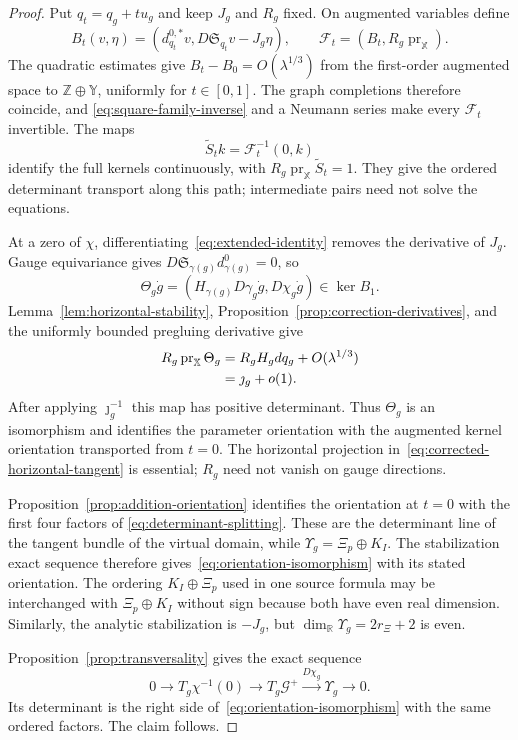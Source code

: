 \documentclass[11pt]{amsart}
\theoremstyle{definition}
\theoremstyle{remark}
\theoremstyle{plain}
\newcommand{\RR}{\mathbb{R}}
\newcommand{\cG}{\mathcal{G}}
\begin{document}
\begin{proof}
Put $q_t=q_g+t u_g$ and keep $J_g$ and $R_g$ fixed.  On augmented
variables define
\begin{equation}\label{eq:corrected-kernel-transport}
 B_t(v,\eta)=
 (d_{q_t}^{0,*}v,D\mathfrak S_{q_t}v-J_g\eta),\qquad
 \mathcal F_t=(B_t,R_g\operatorname{pr}_{\mathbb X}).
\end{equation}
The quadratic estimates give $B_t-B_0=O(\lambda^{1/3})$ from the
first-order augmented space to $\mathbb Z\oplus\mathbb Y$, uniformly
for $t\in[0,1]$.  The graph completions therefore coincide, and
\eqref{eq:square-family-inverse} and a Neumann series make every
$\mathcal F_t$ invertible.  The maps
\[
 \widetilde S_t k=\mathcal F_t^{-1}(0,k)
\]
identify the full kernels continuously, with
$R_g\operatorname{pr}_{\mathbb X}\widetilde S_t=1$.  They give the
ordered determinant transport along this path; intermediate pairs
need not solve the equations.

At a zero of $\chi$, differentiating~\eqref{eq:extended-identity}
removes the derivative of $J_g$.  Gauge equivariance gives
$D\mathfrak S_{\gamma(g)}d_{\gamma(g)}^0=0$, so
\begin{equation}\label{eq:corrected-horizontal-tangent}
 \Theta_g\dot g=
 (H_{\gamma(g)}D\gamma_g\dot g,D\chi_g\dot g)
 \in\ker B_1.
\end{equation}
Lemma~\ref{lem:horizontal-stability},
Proposition~\ref{prop:correction-derivatives}, and the uniformly bounded
pregluing derivative give
\begin{align}\label{eq:corrected-tangent-retraction}
 R_g\operatorname{pr}_{\mathbb X}\Theta_g
 &=R_gH_gdq_g+O(\lambda^{1/3})\notag\\
 &=\jmath_g+o(1).
\end{align}
After applying $\jmath_g^{-1}$ this map has positive determinant.
Thus $\Theta_g$ is an isomorphism and identifies the parameter orientation
with the augmented kernel orientation transported from $t=0$.
The horizontal projection in~\eqref{eq:corrected-horizontal-tangent}
is essential; $R_g$ need not vanish on gauge directions.

Proposition~\ref{prop:addition-orientation} identifies the orientation
at $t=0$ with the first four factors of
\eqref{eq:determinant-splitting}.  These are the determinant line of
the tangent bundle of the virtual domain, while
$\Upsilon_g=\Xi_p\oplus K_I$.  The stabilization exact sequence
therefore gives~\eqref{eq:orientation-isomorphism} with its stated
orientation.  The ordering $K_I\oplus\Xi_p$ used in one source formula may be
interchanged with $\Xi_p\oplus K_I$ without sign because both have even real
dimension.  Similarly, the analytic stabilization is $-J_g$, but
$\dim_\RR\Upsilon_g=2r_\Xi+2$ is even.

Proposition~\ref{prop:transversality} gives the exact sequence
\[
 0\longrightarrow T_g\chi^{-1}(0)\longrightarrow T_g\cG^+
 \xrightarrow{D\chi_g}\Upsilon_g\longrightarrow0.
\]
Its determinant is the right side of~\eqref{eq:orientation-isomorphism}
with the same ordered factors.  The claim follows.
\end{proof}
\end{document}
